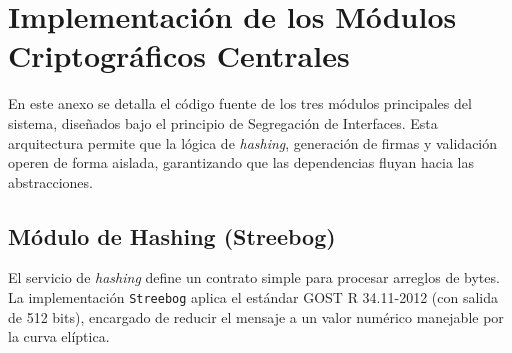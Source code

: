 \section{Implementación de los Módulos Criptográficos Centrales}
\label{anexo:modulos_core}

En este anexo se detalla el código fuente de los tres módulos principales del sistema, diseñados bajo el principio de Segregación de Interfaces. Esta arquitectura permite que la lógica de \textit{hashing}, generación de firmas y validación operen de forma aislada, garantizando que las dependencias fluyan hacia las abstracciones.

\subsection{Módulo de Hashing (Streebog)}
El servicio de \textit{hashing} define un contrato simple para procesar arreglos de bytes. La implementación \texttt{Streebog} aplica el estándar GOST R 34.11-2012 (con salida de 512 bits), encargado de reducir el mensaje a un valor numérico manejable por la curva elíptica.


